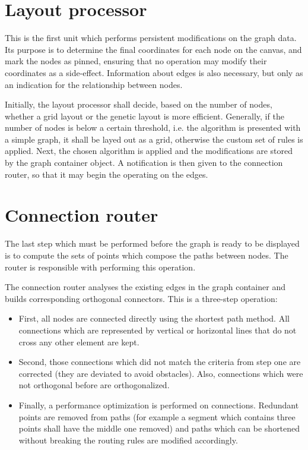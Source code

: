 \section{Layout processor}

This is the first unit which performs persistent modifications on the graph data. Its purpose is to determine 
the final coordinates for each node on the canvas, and mark the nodes as pinned, ensuring that no operation may 
modify their coordinates as a side-effect. Information about edges is also necessary, but only as an indication 
for the relationship between nodes.

Initially, the layout processor shall decide, based on the number of nodes, whether a grid layout or the genetic 
layout is more efficient. Generally, if the number of nodes is below a certain threshold, i.e. the algorithm is 
presented with a simple graph, it shall be layed out as a grid, otherwise the custom set of rules is applied. 
Next, the chosen algorithm is applied and the modifications are stored by the graph container object. A notification 
is then given to the connection router, so that it may begin the operating on the edges.

\section{Connection router}

The last step which must be performed before the graph is ready to be displayed is to compute the sets of points which compose 
the paths between nodes. The router is responsible with performing this operation.

The connection router analyses the existing edges in the graph container and builds corresponding orthogonal connectors.
This is a three-step operation:

\begin{itemize}

\item First, all nodes are connected directly using the shortest path method. All connections which are represented by 
vertical or horizontal lines that do not cross any other element are kept.

\item Second, those connections which did not match the criteria from step one are corrected (they are deviated to avoid 
obstacles). Also, connections which were not orthogonal before are orthogonalized.

\item Finally, a performance optimization is performed on connections. Redundant points are removed from paths (for example 
a segment which contains three points shall have the middle one removed) and paths which can be shortened without breaking 
the routing rules are modified accordingly.

\end{itemize}

